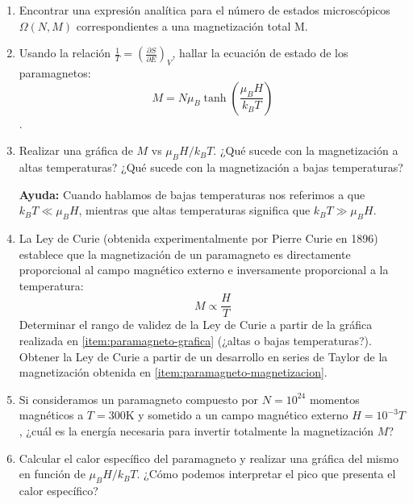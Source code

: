 \documentclass[a4paper,11pt]{article}
\begin{document}
\begin{enumerate}[label=(\alph*),
                  leftmargin=2\parindent,
                  rightmargin=2\parindent]

    \item{Encontrar una expresión analítica para el número de 
          estados microscópicos $\Omega(N, M)$ correspondientes a una 
          magnetización total M.
          }
    
    \item{\label{item:paramagneto-magnetizacion}
          Usando la relación
          $\frac{1}{T} = \left( \frac{\partial S}{\partial E} \right)_V$,
          hallar la ecuación de estado de los paramagnetos:
          $$ M = N \mu_B \tanh \left( \frac{\mu_B H}{k_B T} \right) $$.
          }
    
    \item{\label{item:paramagneto-grafica}
          Realizar una gráfica de $M$ vs $\mu_B H/k_B T$.
          ¿Qué sucede con la magnetización a altas temperaturas?
          ¿Qué sucede con la magnetización a bajas temperaturas?
          }
    
    {\small
    \textbf{Ayuda:} Cuando hablamos de bajas temperaturas nos referimos 
    a que $k_B T \ll \mu_B H$, mientras que altas temperaturas 
    significa que $k_B T \gg \mu_B H$.
    }

    \item{La Ley de Curie (obtenida experimentalmente por Pierre Curie en 1896)
          establece que la magnetización de un paramagneto es 
          directamente proporcional al campo magnético externo e 
          inversamente proporcional a la temperatura:
          $$ M \propto \frac{H}{T} $$
          Determinar el rango de validez de la Ley de Curie a partir de la
          gráfica realizada en \ref{item:paramagneto-grafica}
          (¿altas o bajas temperaturas?).\\
          Obtener la Ley de Curie a partir de un desarrollo en series 
          de Taylor de la magnetización obtenida en 
          \ref{item:paramagneto-magnetizacion}.
          }
    
    \item{Si consideramos un paramagneto compuesto por $N = 10^{24}$ 
          momentos magnéticos a $T = 300 \text{K}$ y sometido a un 
          campo magnético externo $H = 10^{-3} T$,
          ¿cuál es la energía necesaria para invertir totalmente la 
          magnetización $M$?
          }

    \item{Calcular el calor específico del paramagneto y realizar una 
          gráfica del mismo en función de $\mu_B H / k_B T$.
          ¿Cómo podemos interpretar el pico que presenta el calor específico?
          }

\end{enumerate}
\end{document}
